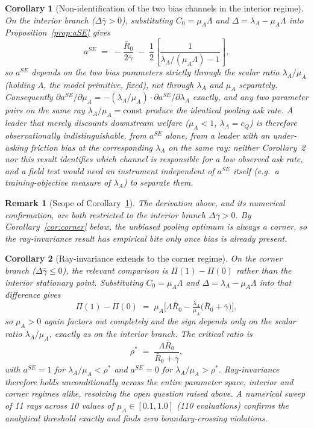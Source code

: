 \documentclass[11pt]{article}
\newtheorem{corollary}{Corollary}
\newtheorem{remark}{Remark}
\begin{document}
\begin{corollary}[Non-identification of the two bias channels in the interior regime]
\label{cor:mu-lambda}
On the interior branch ($\Delta\bar\gamma>0$), substituting $C_0=\mu_A\Lambda$ and
$\Delta=\lambda_A-\mu_A\Lambda$ into Proposition~\ref{prop:aSE} gives
\[
a^{SE} \;=\; -\frac{\bar R_0}{2\bar\gamma} \;-\; \frac{1}{2}
\left[\frac{1}{\lambda_A/(\mu_A\Lambda)-1}\right],
\]
so $a^{SE}$ depends on the two bias parameters strictly through the scalar ratio
$\lambda_A/\mu_A$ (holding $\Lambda$, the model primitive, fixed), not through
$\lambda_A$ and $\mu_A$ separately. Consequently
$\partial a^{SE}/\partial\mu_A = -(\lambda_A/\mu_A)\cdot\partial
a^{SE}/\partial\lambda_A$ exactly, and any two parameter pairs on the same ray
$\lambda_A/\mu_A=\text{const}$ produce the identical pooling ask rate. A leader
that merely discounts downstream welfare ($\mu_A<1$, $\lambda_A=c_Q$) is
therefore observationally indistinguishable, from $a^{SE}$ alone, from a leader
with an under-asking friction bias at the corresponding $\lambda_A$ on the same
ray: neither Corollary~2 nor this result identifies which channel is responsible
for a low observed ask rate, and a field test would need an instrument
independent of $a^{SE}$ itself (e.g.\ a training-objective measure of
$\lambda_A$) to separate them.
\end{corollary}

\begin{remark}[Scope of Corollary~\ref{cor:mu-lambda}]
The derivation above, and its numerical confirmation, are both restricted to the
interior branch $\Delta\bar\gamma>0$. By Corollary~\ref{cor:corner} below, the
\emph{unbiased} pooling optimum is always a corner, so the ray-invariance result
has empirical bite only once bias is already present.
\end{remark}

\begin{corollary}[Ray-invariance extends to the corner regime]\label{cor:corner-ray}
On the corner branch ($\Delta\bar\gamma\le 0$), the relevant comparison is
$\Pi(1)-\Pi(0)$ rather than the interior stationary point. Substituting
$C_0=\mu_A\Lambda$ and $\Delta=\lambda_A-\mu_A\Lambda$ into that difference gives
\[
\Pi(1)-\Pi(0) \;=\; \mu_A\Big[\Lambda\bar R_0 - \tfrac{\lambda_A}{\mu_A}\big(\bar
R_0+\bar\gamma\big)\Big],
\]
so $\mu_A>0$ again factors out completely and the sign depends only on the
scalar ratio $\lambda_A/\mu_A$, exactly as on the interior branch. The critical
ratio is
\[
\rho^{*} \;=\; \frac{\Lambda\bar R_0}{\bar R_0+\bar\gamma},
\]
with $a^{SE}=1$ for $\lambda_A/\mu_A<\rho^{*}$ and $a^{SE}=0$ for
$\lambda_A/\mu_A>\rho^{*}$. Ray-invariance therefore holds unconditionally
across the entire parameter space, interior and corner regimes alike,
resolving the open question raised above. A numerical sweep of 11 rays across
10 values of $\mu_A\in[0.1,1.0]$ (110 evaluations) confirms the analytical
threshold exactly and finds zero boundary-crossing violations.
\end{corollary}
\end{document}
